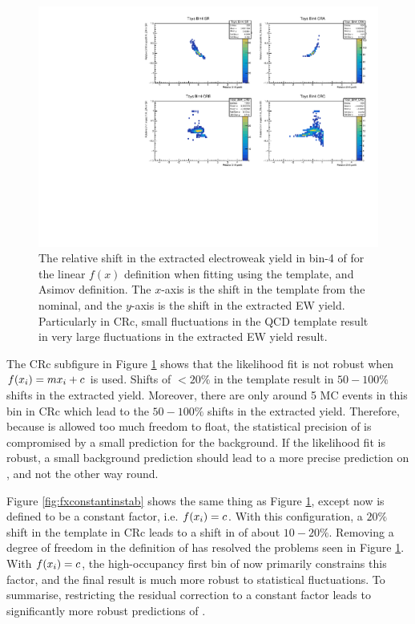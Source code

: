 \begin{figure}[t]
  \centering
  \includegraphics[width=\textwidth]{plots/diffx/instab/linearfx/instabilities_mjj_QCD_Mgraph_Signal_Sh2211_BSMCQCDSTATS_linearfx_newbinning_madgraphasimov_bin4.pdf}
  \caption{The relative shift in the extracted electroweak yield in bin-4 of \mjj for the linear $f(x)$ definition when fitting using the \MADGRAPH \qcdwy template, and \MADGRAPH \qcdwy Asimov definition. The $x$-axis is the shift in the \qcdwy template from the nominal, and the $y$-axis is the shift in the extracted EW yield. Particularly in CRc, small fluctuations in the QCD template result in very large fluctuations in the extracted EW yield result. \label{fig:lastbin_mjj_instabilities}}
\end{figure}

The CRc subfigure in Figure \ref{fig:lastbin_mjj_instabilities} shows that the likelihood fit is not robust when $f(x_i)=mx_i+c$ is used. Shifts of $<20\%$ in the \qcdwy template result in $50-100\%$ shifts in the extracted \ewwy yield. Moreover, there are only around 5 MC events in this bin in CRc which lead to the $50-100\%$ shifts in the extracted yield. Therefore, because \fx is allowed too much freedom to float, the statistical precision of \muew is compromised by a small prediction for the background. If the likelihood fit is robust, a small background prediction should lead to a more precise prediction on \muew, and not the other way round. 

Figure \ref{fig:fxconstantinstab} shows the same thing as Figure \ref{fig:lastbin_mjj_instabilities}, except now \fx is defined to be a constant factor, i.e. $f(x_i)=c$. With this configuration, a $20\%$ shift in the \qcdwy template in CRc leads to a shift in \muew of about $10-20\%$. Removing a degree of freedom in the definition of \fx has resolved the problems seen in Figure \ref{fig:lastbin_mjj_instabilities}. With $f(x_i)=c$, the high-occupancy first bin of \mjj now primarily constrains this factor, and the final result is much more robust to statistical fluctuations. To summarise, restricting the residual correction to a constant factor leads to significantly more robust predictions of \muew. 

